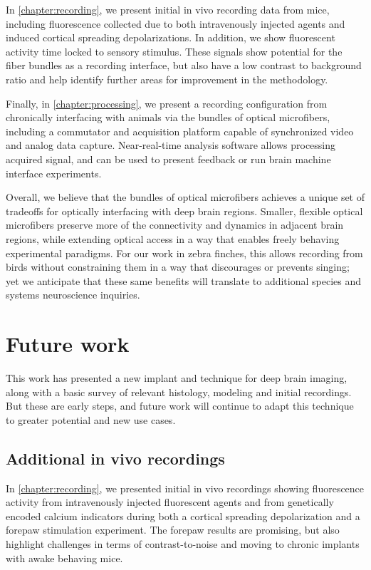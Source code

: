 In \cref{chapter:recording}, we present initial 
in vivo recording data from mice, including fluorescence 
collected due to both intravenously injected agents 
and induced cortical spreading depolarizations. 
In addition, we show fluorescent activity time 
locked to sensory stimulus. These signals show 
potential for the fiber bundles as a recording 
interface, but also have a low contrast to 
background ratio and help identify further areas 
for improvement in the methodology.

Finally, in \cref{chapter:processing}, we 
present a recording configuration from chronically 
interfacing with animals via the bundles of optical 
microfibers, including a commutator and acquisition 
platform capable of synchronized video and analog 
data capture. Near-real-time analysis software 
allows processing acquired signal, and can be 
used to present feedback or run brain machine 
interface experiments.

Overall, we believe that the bundles of optical 
microfibers achieves a unique set of tradeoffs 
for optically interfacing with deep brain regions. 
Smaller, flexible optical microfibers preserve 
more of the connectivity and dynamics in adjacent 
brain regions, while extending optical access in a 
way that enables freely behaving experimental 
paradigms. For our work in zebra finches, this 
allows recording from birds without constraining 
them in a way that discourages or prevents singing; 
yet we anticipate that these same benefits will 
translate to additional species and systems 
neuroscience inquiries.

\section{Future work}

This work has presented a new implant and technique
for deep brain imaging, along with a basic survey of 
relevant histology, modeling and initial recordings. 
But these are early steps, and future work will 
continue to adapt this technique to greater potential 
and new use cases.

\subsection{Additional in vivo recordings}

In \cref{chapter:recording}, we presented initial 
in vivo recordings showing fluorescence activity 
from intravenously injected fluorescent agents and 
from genetically encoded calcium indicators during 
both a cortical spreading depolarization and a 
forepaw stimulation experiment. The forepaw results 
are promising, but also highlight challenges in 
terms of contrast-to-noise and moving to chronic 
implants with awake behaving mice.

